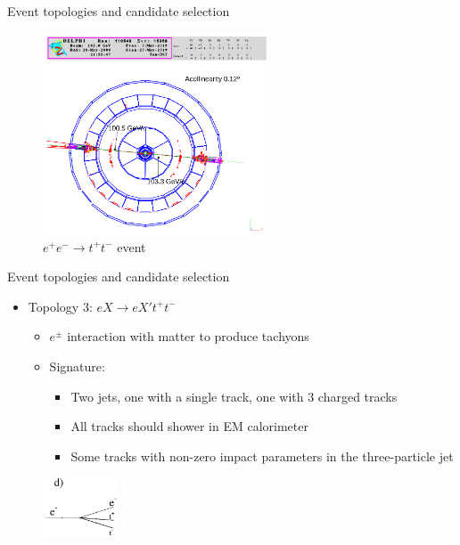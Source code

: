 \documentclass{beamer}
\begin{document}
\begin{frame}{Event topologies and candidate selection}
  \begin{figure}
    \centering
    \includegraphics[width = 0.6\textwidth]{Topology2.png}
    \caption{$e^+e^-\to t^+t^-$ event}
  \end{figure}
\end{frame}

\begin{frame}{Event topologies and candidate selection}
  \begin{itemize}
    \item{Topology $3$: $eX\to eX't^+t^-$}
    \begin{itemize}
      \item{$e^\pm$ interaction with matter to produce tachyons}
      \item{Signature:}
      \begin{itemize}
        \item{Two jets, one with a single track, one with $3$ charged tracks}
        \item{All tracks should shower in EM calorimeter}
        \item{Some tracks with non-zero impact parameters in the three-particle jet}
      \end{itemize}
    \end{itemize}
  \end{itemize}
  \begin{figure}
    \centering
    \includegraphics[width = 0.2\textwidth]{TopologyD.png}
  \end{figure}%
\end{frame}
\end{document}
